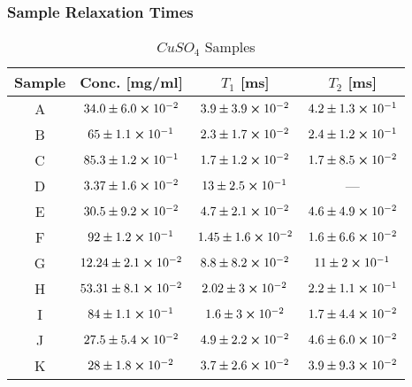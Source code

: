 \begin{frame}
  \frametitle{Sample Relaxation Times}
  \begin{table}[H]
    \centering
    \begin{tabular}{ c  c  c  c }
    \hline
    Sample & Conc. [mg/ml] & $T_1$ [ms] & $T_2$ [ms]\\
    \hline
    A & $34.0 \pm 6.0 \cross 10^{-2}$ & $3.9 \pm 3.9 \cross 10^{-2}$ & $4.2 \pm 1.3 \cross 10^{-1}$\\
    B & $65 \pm 1.1 \cross 10^{-1}$ & $2.3 \pm 1.7 \cross 10^{-2}$ & $2.4 \pm 1.2 \cross 10^{-1}$\\
    C & $85.3 \pm 1.2 \cross 10^{-1}$ & $1.7 \pm 1.2 \cross 10^{-2}$ & $1.7 \pm 8.5 \cross 10^{-2}$\\
    D & $3.37 \pm 1.6 \cross 10^{-2}$ & $13 \pm 2.5 \cross 10^{-1}$ & —\\
    E & $30.5 \pm 9.2 \cross 10^{-2}$ & $4.7 \pm 2.1 \cross 10^{-2}$ & $4.6 \pm 4.9 \cross 10^{-2}$\\
    F & $92 \pm 1.2 \cross 10^{-1}$ & $1.45 \pm 1.6 \cross 10^{-2}$ & $1.6 \pm 6.6 \cross 10^{-2}$\\
    G & $12.24 \pm 2.1 \cross 10^{-2}$ & $8.8 \pm 8.2 \cross 10^{-2}$ & $11 \pm 2 \cross 10^{-1}$\\
    H & $53.31 \pm 8.1 \cross 10^{-2}$ & $2.02 \pm 3 \cross 10^{-2}$ & $2.2 \pm 1.1 \cross 10^{-1}$\\
    I & $84 \pm 1.1 \cross 10^{-1}$ & $1.6 \pm 3 \cross 10^{-2}$ & $1.7 \pm 4.4 \cross 10^{-2}$\\
    J & $27.5 \pm 5.4 \cross 10^{-2}$ & $4.9 \pm 2.2 \cross 10^{-2}$ & $4.6 \pm 6.0 \cross 10^{-2}$\\
    K & $28 \pm 1.8 \cross 10^{-2}$ & $3.7 \pm 2.6 \cross 10^{-2}$ & $3.9 \pm 9.3 \cross 10^{-2}$\\
    \hline
    \end{tabular}
    \caption{$CuSO_4$ Samples}
    \label{table:samples}
    \end{table}
\end{frame}